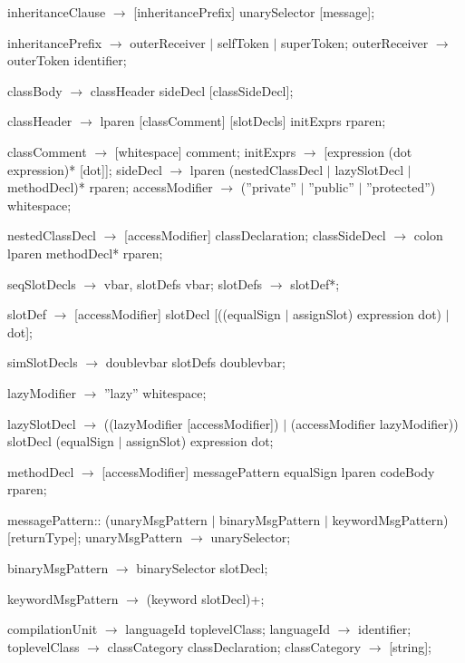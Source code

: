 \documentclass{article}
\begin{document}
\begin{newspeak}
inheritanceClause $\rightarrow$ [inheritancePrefix] unarySelector [message];

inheritancePrefix $\rightarrow$ outerReceiver $|$  
                              selfToken $|$  
                              superToken;
outerReceiver $\rightarrow$ outerToken identifier;       

classBody $\rightarrow$ classHeader sideDecl [classSideDecl];

classHeader $\rightarrow$  lparen  [classComment] 
                        [slotDecls] initExprs  rparen;  
                                             
classComment  $\rightarrow$ [whitespace] comment;    
initExprs $\rightarrow$ [expression (dot expression)* [dot]];  
sideDecl $\rightarrow$ lparen (nestedClassDecl $|$ lazySlotDecl $|$ methodDecl)* rparen;
accessModifier $\rightarrow$  (''private'' $|$ 
                        ''public'' $|$
                        ''protected'') whitespace;

nestedClassDecl $\rightarrow$ [accessModifier] classDeclaration;
classSideDecl $\rightarrow$ colon lparen methodDecl* rparen;     

seqSlotDecls $\rightarrow$ vbar, slotDefs vbar;
slotDefs $\rightarrow$ slotDef*;

slotDef $\rightarrow$  [accessModifier] slotDecl
     [((equalSign $|$ assignSlot) expression dot) $|$ dot];
     
simSlotDecls $\rightarrow$ doublevbar slotDefs doublevbar;

lazyModifier $\rightarrow$ ''lazy'' whitespace;

lazySlotDecl $\rightarrow$ ((lazyModifier [accessModifier]) $|$ (accessModifier lazyModifier))
                      slotDecl (equalSign $|$  assignSlot) expression dot;
                      
methodDecl $\rightarrow$ [accessModifier] messagePattern equalSign 
                  lparen codeBody rparen;
                    
messagePattern::  (unaryMsgPattern $|$
                       binaryMsgPattern $|$
                       keywordMsgPattern) [returnType];
unaryMsgPattern $\rightarrow$ unarySelector;

binaryMsgPattern $\rightarrow$ binarySelector slotDecl;
                                                         
keywordMsgPattern $\rightarrow$ (keyword slotDecl)+;

compilationUnit $\rightarrow$  languageId toplevelClass;
languageId  $\rightarrow$   identifier;
toplevelClass $\rightarrow$ classCategory classDeclaration;
classCategory $\rightarrow$ [string];



\end{newspeak}
\end{document}
